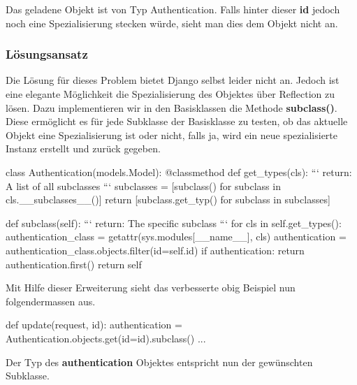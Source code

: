 \medskip
Das geladene Objekt ist von Typ Authentication. Falls hinter dieser \textbf{id} jedoch noch eine Spezialisierung stecken würde, sieht man dies dem Objekt nicht an.
\subsubsection{Lösungsansatz}
Die Lösung für dieses Problem bietet Django selbst leider nicht an. Jedoch ist eine elegante Möglichkeit die Spezialisierung des Objektes über Reflection zu lösen. Dazu implementieren wir in den Basisklassen die Methode \textbf{subclass()}.\\
Diese ermöglicht es für jede Subklasse der Basisklasse zu testen, ob das aktuelle Objekt eine Spezialisierung ist oder nicht, falls ja, wird ein neue spezialisierte Instanz erstellt und zurück gegeben.
\medskip
\begin{python}
class Authentication(models.Model):
    @classmethod
    def get_types(cls):
        ```
        return: A list of all subclasses
        ```
        subclasses = [subclass() for subclass in cls.__subclasses__()]
        return [subclass.get_typ() for subclass in subclasses]	
	
    def subclass(self):
        ```
        return: The specific subclass 
        ```
        for cls in self.get_types():
            authentication_class = getattr(sys.modules[__name__], cls)
            authentication = authentication_class.objects.filter(id=self.id)
            if authentication:
                return authentication.first()
        return self
\end{python}
\medskip
Mit Hilfe dieser Erweiterung sieht das verbesserte obig Beispiel nun folgendermassen aus.
\medskip
\begin{python}
def update(request, id):
    authentication = Authentication.objects.get(id=id).subclass()
    ...
\end{python}
\medskip
Der Typ des \textbf{authentication} Objektes entspricht nun der gewünschten Subklasse.\\\\


